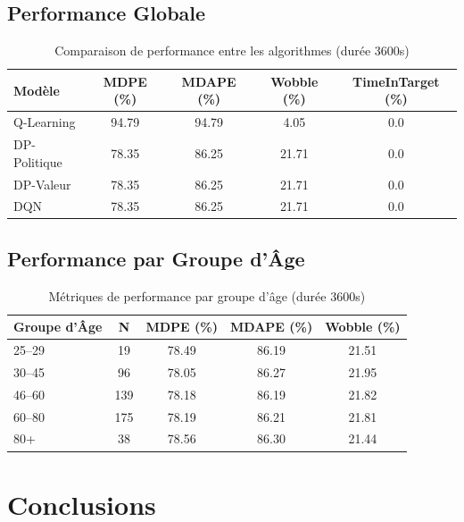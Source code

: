 \documentclass[12pt,a4paper]{article}
\begin{document}
\subsection{Performance Globale}

\begin{table}[htbp]
    \centering
    \caption{Comparaison de performance entre les algorithmes (durée 3600s)}
    \begin{tabular}{lcccc}
        \toprule
        \textbf{Modèle} & \textbf{MDPE (\%)} & \textbf{MDAPE (\%)} & \textbf{Wobble (\%)} & \textbf{TimeInTarget (\%)} \\
        \midrule
        Q-Learning & 94.79 & 94.79 & 4.05 & 0.0 \\
        DP-Politique & 78.35 & 86.25 & 21.71 & 0.0 \\
        DP-Valeur & 78.35 & 86.25 & 21.71 & 0.0 \\
        DQN & 78.35 & 86.25 & 21.71 & 0.0 \\
        \bottomrule
    \end{tabular}
\end{table}

\subsection{Performance par Groupe d'Âge}

\begin{table}[htbp]
    \centering
    \caption{Métriques de performance par groupe d'âge (durée 3600s)}
    \begin{tabular}{lcccc}
        \toprule
        \textbf{Groupe d'Âge} & \textbf{N} & \textbf{MDPE (\%)} & \textbf{MDAPE (\%)} & \textbf{Wobble (\%)} \\
        \midrule
        25--29 & 19 & 78.49 & 86.19 & 21.51 \\
        30--45 & 96 & 78.05 & 86.27 & 21.95 \\
        46--60 & 139 & 78.18 & 86.19 & 21.82 \\
        60--80 & 175 & 78.19 & 86.21 & 21.81 \\
        80+ & 38 & 78.56 & 86.30 & 21.44 \\
        \bottomrule
    \end{tabular}
\end{table}

\section{Conclusions}
\end{document}

